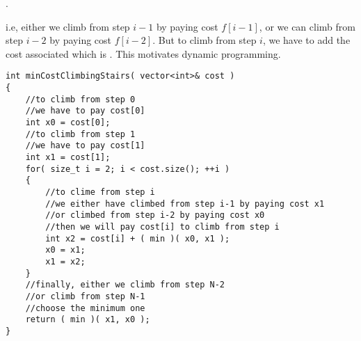 . 

i.e, either we climb from step $i-1$ by paying cost $f[i-1]$, or we can climb from step $i-2$ by paying cost $f[i-2]$. But to climb from step $i$, we have to add the cost associated which is . This motivates dynamic programming.

\setcounter{lstlisting}{0}
\begin{lstlisting}[style=customc, caption={DP}]
int minCostClimbingStairs( vector<int>& cost )
{
    //to climb from step 0
    //we have to pay cost[0]
    int x0 = cost[0];
    //to climb from step 1
    //we have to pay cost[1]
    int x1 = cost[1];
    for( size_t i = 2; i < cost.size(); ++i )
    {
        //to clime from step i
        //we either have climbed from step i-1 by paying cost x1
        //or climbed from step i-2 by paying cost x0
        //then we will pay cost[i] to climb from step i
        int x2 = cost[i] + ( min )( x0, x1 );
        x0 = x1;
        x1 = x2;
    }
    //finally, either we climb from step N-2
    //or climb from step N-1
    //choose the minimum one
    return ( min )( x1, x0 );
}
\end{lstlisting}



